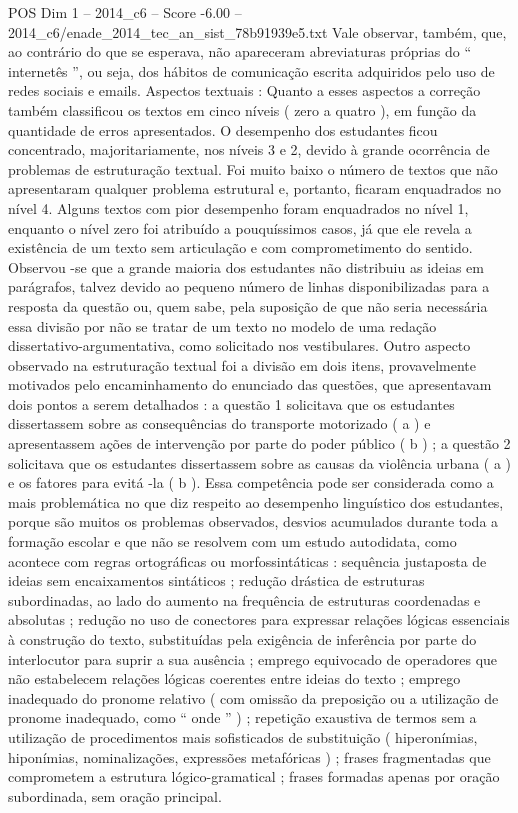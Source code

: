 \begin{textsample}{POS Dim 1 – 2014\_c6 – Score -6.00 – 2014\_c6/enade\_2014\_tec\_an\_sist\_78b91939e5.txt}
Vale observar, também, que, ao contrário do que se esperava, não apareceram abreviaturas próprias do “ internetês ”, ou seja, dos hábitos de comunicação escrita adquiridos pelo uso de redes sociais e emails.
Aspectos textuais : Quanto a esses aspectos a correção também classificou os textos em cinco níveis ( zero a quatro ), em função da quantidade de erros apresentados.
O desempenho dos estudantes ficou concentrado, majoritariamente, nos níveis 3 e 2, devido à grande ocorrência de problemas de estruturação textual.
Foi muito baixo o número de textos que não apresentaram qualquer problema estrutural e, portanto, ficaram enquadrados no nível 4.
Alguns textos com pior desempenho foram enquadrados no nível 1, enquanto o nível zero foi atribuído a pouquíssimos casos, já que ele revela a existência de um texto sem articulação e com comprometimento do sentido.
Observou -se que a grande maioria dos estudantes não distribuiu as ideias em parágrafos, talvez devido ao pequeno número de linhas disponibilizadas para a resposta da questão ou, quem sabe, pela suposição de que não seria necessária essa divisão por não se tratar de um texto no modelo de uma redação dissertativo-argumentativa, como solicitado nos vestibulares.
Outro aspecto observado na estruturação textual foi a divisão em dois itens, provavelmente motivados pelo encaminhamento do enunciado das questões, que apresentavam dois pontos a serem detalhados : a questão 1 solicitava que os estudantes dissertassem sobre as consequências do transporte motorizado ( a ) e apresentassem ações de intervenção por parte do poder público ( b ) ; a questão 2 solicitava que os estudantes dissertassem sobre as causas da violência urbana ( a ) e os fatores para evitá -la ( b ).
Essa competência pode ser considerada como a mais problemática no que diz respeito ao desempenho linguístico dos estudantes, porque são muitos os problemas observados, desvios acumulados durante toda a formação escolar e que não se resolvem com um estudo autodidata, como acontece com regras ortográficas ou morfossintáticas : sequência justaposta de ideias sem encaixamentos sintáticos ; redução drástica de estruturas subordinadas, ao lado do aumento na frequência de estruturas coordenadas e absolutas ; redução no uso de conectores para expressar relações lógicas essenciais à construção do texto, substituídas pela exigência de inferência por parte do interlocutor para suprir a sua ausência ; emprego equivocado de operadores que não estabelecem relações lógicas coerentes entre ideias do texto ; emprego inadequado do pronome relativo ( com omissão da preposição ou a utilização de pronome inadequado, como “ onde ” ) ; repetição exaustiva de termos sem a utilização de procedimentos mais sofisticados de substituição ( hiperonímias, hiponímias, nominalizações, expressões metafóricas ) ; frases fragmentadas que comprometem a estrutura lógico-gramatical ; frases formadas apenas por oração subordinada, sem oração principal.

\end{textsample}
